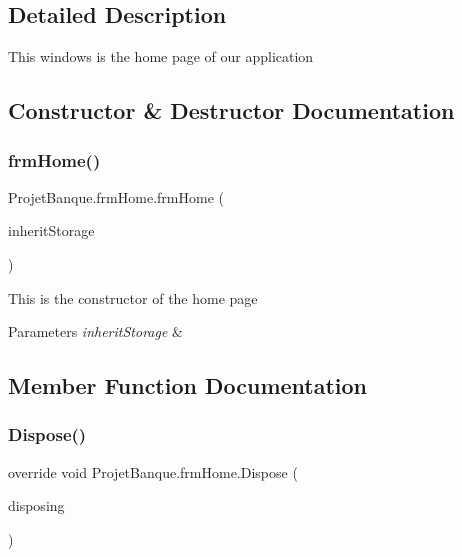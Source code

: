 \subsection{Detailed Description}
This windows is the home page of our application 



\subsection{Constructor \& Destructor Documentation}
\mbox{\label{class_projet_banque_1_1frm_home_a416d8bd59405cc63e21ba3b3186b1f86}} 
\subsubsection{\texorpdfstring{frmHome()}{frmHome()}}
{\footnotesize\ttfamily Projet\+Banque.\+frm\+Home.\+frm\+Home (\begin{DoxyParamCaption}\item[{\mbox{\hyperlink{class_projet_banque_1_1_json_data}{Json\+Data}}}]{inherit\+Storage }\end{DoxyParamCaption})}



This is the constructor of the home page 


\begin{DoxyParams}{Parameters}
{\em inherit\+Storage} & \\
\hline
\end{DoxyParams}


\subsection{Member Function Documentation}
\mbox{\label{class_projet_banque_1_1frm_home_a9cfd52644c0e4b068485ac700fa9a3cb}} 
\subsubsection{\texorpdfstring{Dispose()}{Dispose()}}
{\footnotesize\ttfamily override void Projet\+Banque.\+frm\+Home.\+Dispose (\begin{DoxyParamCaption}\item[{bool}]{disposing }\end{DoxyParamCaption})\hspace{0.3cm}{\ttfamily [protected]}}



